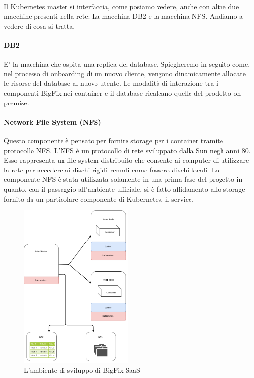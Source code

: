 \paragraph{}
Il Kubernetes master si interfaccia, come posiamo vedere, anche con altre due macchine presenti nella rete: La macchina DB2 e la macchina NFS. Andiamo a vedere di cosa si tratta.
\paragraph{DB2}
E' la macchina che ospita una replica del database. Spiegheremo in seguito come, nel processo di onboarding di un nuovo cliente, vengono dinamicamente allocate le risorse del database al nuovo utente. Le modalità di interazione tra i componenti BigFix nei container e il database ricalcano quelle del prodotto on premise.
\paragraph{Network File System (NFS)}
Questo componente è pensato per fornire storage per i container tramite protocollo NFS. L'NFS è un protocollo di rete sviluppato dalla Sun negli anni 80. Esso rappresenta un file system distribuito che consente ai computer di utilizzare la rete per accedere ai dischi rigidi remoti come fossero dischi locali. La componente NFS è stata utilizzata solamente in una prima fase del progetto in quanto, con il passaggio all'ambiente ufficiale, si è fatto affidamento allo storage fornito da un particolare componente di Kubernetes, il service. 

\begin{figure}[h!]
	\centering
	\includegraphics[width=0.5\textwidth,keepaspectratio=true]{capitoli/imgs/EnvironmentsComponentDiagram.png}
	\caption{L'ambiente di sviluppo di BigFix SaaS}
\end{figure}


